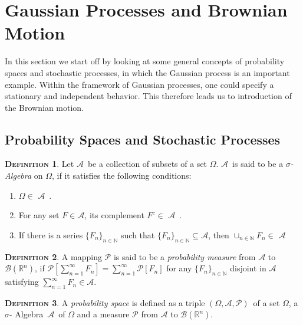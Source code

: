 \documentclass[a4paper, twoside, 11pt]{article}
\theoremstyle{definition}
\newtheorem{definition}{\scshape Definition}[section]
\def\AA{$\mathscr{A}$\ }
\newcommand{\compl}[1]{{#1}^{c}}
\def\sa{$\sigma$- Algebra\ }
\def\bs{$(\Omega, \mathscr{A}, \mathcal{P})$\ }
\def\bsigma{\mathscr{B}\brkt{\mathbb{R}^{n}}}
\newcommand{\sqbr}[1]{\left[ {#1} \right]}
\newcommand{\brkt}[1]{\left({#1} \right)}
\begin{document}
  \newpage

  \section{Gaussian Processes and Brownian Motion}
  \setcounter{equation}{0}
  In this section we start off by looking at some general concepts of probability spaces and stochastic processes, in which the Gaussian process is  an important example. Within the framework of Gaussian processes, one could specify a stationary and independent behavior. This therefore leads us to introduction of the Brownian motion.

  \subsection{Probability Spaces and Stochastic Processes }
  \begin{definition}
	Let \AA be a collection of subsets of a set $\Omega$. \AA is said to be a \emph{$\sigma$- Algebra} on $\Omega$, if it satisfies the following conditions:
	\begin{enumerate}[topsep=0pt, itemsep=-1ex, partopsep=1ex, parsep=1ex, label=(\roman*)]
	  \item $\Omega \in $ \AA.
	  \item For any set $F \in \mathscr{A}$, its complement $\compl{F} \in$ \AA.
	  \item If there is a series $\{F_n\}_{n\in \mathbb{N}}$ such that $\{F_n\}_{n \in \mathbb{N}} \subseteq \mathscr{A}$, then $\cup_{n \in \mathbb{N}}F_n \in $ \AA
	\end{enumerate}
  \end{definition}

  \begin{definition}
	A mapping $\mathcal{P}$ is said to be a \emph{probability measure} from $\mathscr{A}$ to $\bsigma$, if $\mathcal{P}\sqbr{\sum_{n=1}^{\infty} F_n} = \sum_{n=1}^{\infty} \mathcal{P}\sqbr{F_n}$ for any $\{F_n\}_{n \in \mathbb{N}}$ disjoint in $\mathscr{A}$ satisfying $\sum_{n=1}^{\infty}F_n \in \mathscr{A}$. 
  \end{definition}

  \begin{definition}
	A \emph{probability space} is defined as a triple \bs of a set $\Omega$, a \sa \AA  of $\Omega$ and a measure $\mathcal{P}$ from $\mathscr{A}$ to $\bsigma$.
  \end{definition}
\end{document}
